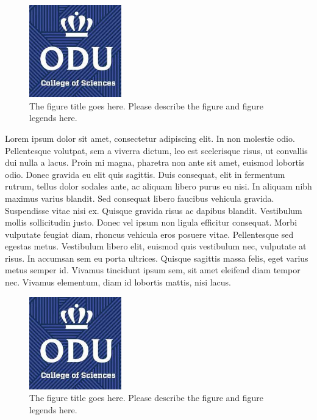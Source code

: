 \begin{figure}[tbh]
  \centering
  \includegraphics[height=4cm]{Figures/cos1.jpeg}
  \caption[The figure title goes here.]{The figure title goes here. Please describe the figure and figure legends here.}
  \label{fig:cos1_4}
\end{figure}

Lorem ipsum dolor sit amet, consectetur adipiscing elit. In non molestie odio. Pellentesque volutpat, sem a viverra dictum, leo est scelerisque risus, ut convallis dui nulla a lacus. Proin mi magna, pharetra non ante sit amet, euismod lobortis odio. Donec gravida eu elit quis sagittis. Duis consequat, elit in fermentum rutrum, tellus dolor sodales ante, ac aliquam libero purus eu nisi. In aliquam nibh maximus varius blandit. Sed consequat libero faucibus vehicula gravida. Suspendisse vitae nisi ex. Quisque gravida risus ac dapibus blandit. Vestibulum mollis sollicitudin justo. Donec vel ipsum non ligula efficitur consequat. Morbi vulputate feugiat diam, rhoncus vehicula eros posuere vitae. Pellentesque sed egestas metus. Vestibulum libero elit, euismod quis vestibulum nec, vulputate at risus. In accumsan sem eu porta ultrices. Quisque sagittis massa felis, eget varius metus semper id. Vivamus tincidunt ipsum sem, sit amet eleifend diam tempor nec. Vivamus elementum, diam id lobortis mattis, nisi lacus.

\begin{figure}[tbh]
  \centering
  \includegraphics[height=4cm]{Figures/cos1.jpeg}
  \caption[The figure title goes here.]{The figure title goes here. Please describe the figure and figure legends here.}
  \label{fig:cos1_5}
\end{figure}

